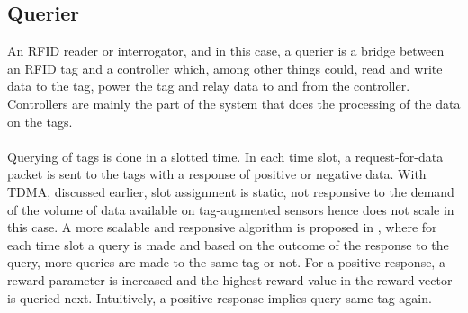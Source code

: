 \subsection{Querier}
An RFID reader or interrogator, and in this case, a querier is a bridge between an RFID
tag and a controller which, among other things could, read and write data to the tag,
power the tag and relay data to and from the controller\cite{HuntPuglia&Puglia}.\\
Controllers are mainly the part of the system that does the processing of the data on
the tags.\\\\
Querying of tags is done in a slotted time. In each time slot, a request-for-data
packet is sent to the tags with a response of positive or negative data. With TDMA,
discussed earlier, slot assignment is static, not responsive to the demand of the
volume of data available on tag-augmented sensors hence does not scale in this case.
A more scalable and responsive algorithm is proposed in \cite{Maselli}, where for each
time slot a query is made and based on the outcome of the response to the query, more
queries are made to the same tag or not. For a positive response, a reward parameter
is increased and the highest reward value in the reward vector is queried next.
Intuitively, a positive response implies query same tag again.\\
